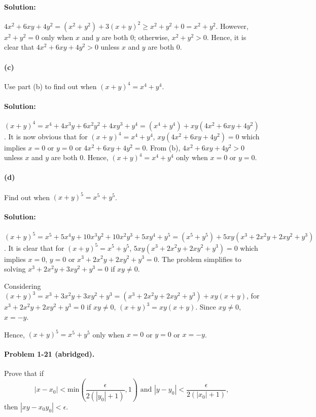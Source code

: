 \documentclass{article}
\begin{document}
\paragraph{Solution:} $4x^2 + 6xy + 4y^2 = (x^2 + y^2) + 3(x + y)^2 \geq
x^2 + y^2 + 0 = x^2 + y^2$. However, $x^2 + y^2 = 0$ only when $x$ and $y$ are
both 0; otherwise, $x^2 + y^2 > 0$.  Hence, it is clear that $4x^2 + 6xy + 4y^2
> 0$ unless $x$ and $y$ are both 0.

\paragraph{(c)} Use part (b) to find out when $(x + y)^4 = x^4 + y^4$.

\paragraph{Solution:} $(x + y)^4 = x^4 + 4x^3y + 6x^2y^2 + 4xy^3 + y^4 =
(x^4 + y^4) + xy(4x^2 + 6xy + 4y^2)$. It is now obvious that for $(x + y)^4 =
x^4 + y^4$, $xy(4x^2 + 6xy + 4y^2) = 0$ which implies $x = 0$ or $y = 0$ or
$4x^2 + 6xy + 4y^2 = 0$. From (b), $4x^2 + 6xy + 4y^2 > 0$ unless $x$ and $y$
are both 0. Hence, $(x + y)^4 = x^4 + y^4$ only when $x = 0$ or $y = 0$.

\paragraph{(d)} Find out when $(x + y)^5 = x^5 + y^5$.

\paragraph{Solution:} $(x + y)^5 = x^5 + 5x^4y + 10x^3y^2 + 10x^2y^3 +
5xy^4 + y^5 = (x^5 + y^5) + 5xy(x^3 + 2x^2y + 2xy^2 + y^3)$. It is clear that
for $(x + y)^5 = x^5 + y^5$, $5xy(x^3 + 2x^2y + 2xy^2 + y^3) = 0$ which implies
$x = 0$, $y = 0$ or $x^3 + 2x^2y + 2xy^2 + y^3 = 0$. The problem simplifies to
solving $x^3 + 2x^2y + 3xy^2 + y^3 = 0$ if $xy \neq 0$.

Considering $(x + y)^3 = x^3 + 3x^2y + 3xy^2 + y^3 = (x^3 + 2x^2y + 2xy^2 +
y^3) + xy(x + y)$, for $x^3 + 2x^2y + 2xy^2 + y^3 = 0$ if $xy \neq 0$, $(x +
y)^3 = xy(x + y)$. Since $xy \neq 0$, $x = -y$.

Hence, $(x + y)^5 = x^5 + y^5$ only when $x = 0$ or $y = 0$ or $x = -y$.

\paragraph{Problem 1-21 (abridged).} Prove that if \begin{equation*}
  |x - x_0| < \mathrm{min}\left(\frac{\epsilon}{2(|y_0| + 1)}, 1\right)
    \text{ and } |y - y_0| < \frac{\epsilon}{2(|x_0| + 1)},
\end{equation*} then $|xy - x_0y_0| < \epsilon$.
\end{document}
